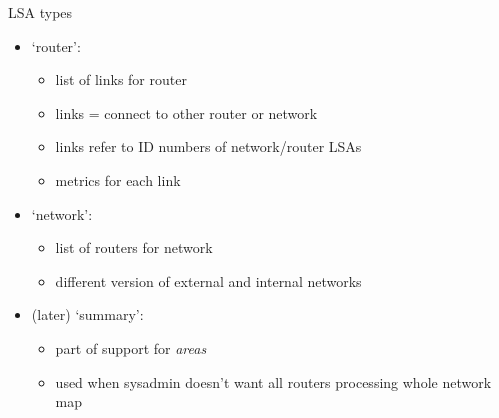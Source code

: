 \begin{frame}{LSA types}
\begin{itemize}
\item `router':
    \begin{itemize}
    \item list of links for router
    \item links = connect to other router or network
    \item links refer to ID numbers of network/router LSAs
    \item metrics for each link
    \end{itemize}
\item `network':
    \begin{itemize}
    \item list of routers for network
    \item different version of external and internal networks
    \end{itemize}
\item (later) `summary':
    \begin{itemize}
    \item part of support for \textit{areas}
    \item used when sysadmin doesn't want all routers processing whole network map
    \end{itemize}
\end{itemize}
\end{frame}
